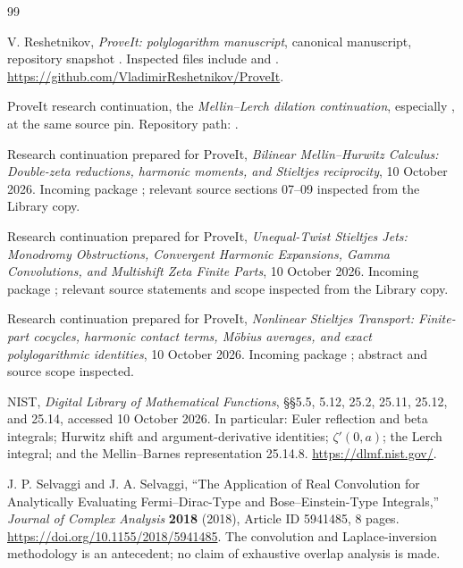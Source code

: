 \begin{thebibliography}{99}
V. Reshetnikov, \emph{ProveIt: polylogarithm manuscript}, canonical manuscript, repository snapshot
\pin. Inspected files include
 and
.
\url{https://github.com/VladimirReshetnikov/ProveIt}.

ProveIt research continuation, the \emph{Mellin--Lerch dilation continuation}, especially
, at the same source pin.
Repository path:
.

Research continuation prepared for ProveIt,
\emph{Bilinear Mellin--Hurwitz Calculus: Double-zeta reductions, harmonic
moments, and Stieltjes reciprocity}, 10 October 2026.
Incoming package ;
relevant source sections 07--09 inspected from the Library copy.

Research continuation prepared for ProveIt,
\emph{Unequal-Twist Stieltjes Jets: Monodromy Obstructions, Convergent
Harmonic Expansions, Gamma Convolutions, and Multishift Zeta Finite Parts},
10 October 2026. Incoming package
; relevant source
statements and scope inspected from the Library copy.

Research continuation prepared for ProveIt,
\emph{Nonlinear Stieltjes Transport: Finite-part cocycles, harmonic contact
terms, M\"obius averages, and exact polylogarithmic identities},
10 October 2026. Incoming package
;
abstract and source scope inspected.

NIST, \emph{Digital Library of Mathematical Functions},
\S\S5.5, 5.12, 25.2, 25.11, 25.12, and 25.14, accessed
10 October 2026. In particular: Euler reflection and beta integrals;
Hurwitz shift and argument-derivative identities;
$\zeta'(0,a)$; the Lerch integral; and the Mellin--Barnes representation
25.14.8.
\url{https://dlmf.nist.gov/}.

J. P. Selvaggi and J. A. Selvaggi,
``The Application of Real Convolution for Analytically Evaluating
Fermi--Dirac-Type and Bose--Einstein-Type Integrals,''
\emph{Journal of Complex Analysis} \textbf{2018} (2018),
Article ID 5941485, 8 pages.
\url{https://doi.org/10.1155/2018/5941485}.
The convolution and Laplace-inversion methodology is an antecedent;
no claim of exhaustive overlap analysis is made.
\end{thebibliography}
